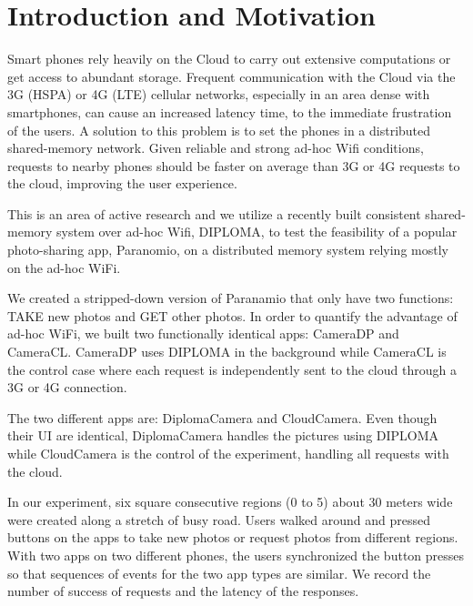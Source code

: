 \chapter{Introduction and Motivation}

Smart phones rely heavily on the Cloud to carry out extensive computations or get access to abundant storage.  Frequent communication with the Cloud via the 3G (HSPA) or 4G (LTE) cellular networks, especially in an area dense with smartphones, can cause an increased latency time, to the immediate frustration of the users. A solution to this problem is to set the phones in a distributed shared-memory network. Given reliable and strong ad-hoc Wifi conditions, requests to nearby phones should be faster on average than 3G or 4G requests to the cloud, improving the user experience. 

This is an area of active research and we utilize a recently built consistent shared-memory system over ad-hoc Wifi, DIPLOMA, to test the feasibility of a popular photo-sharing app, Paranomio, on a distributed memory system relying mostly on the ad-hoc WiFi.

We created a stripped-down version of Paranamio that only have two functions: TAKE new photos and GET other photos. In order to quantify the advantage of ad-hoc WiFi, we built two functionally identical apps: CameraDP and CameraCL. CameraDP uses DIPLOMA in the background while CameraCL is the control case where each request is independently sent to the cloud through a 3G or 4G connection.

The two different apps are: DiplomaCamera and CloudCamera. Even though their UI are identical, DiplomaCamera handles the pictures using DIPLOMA while CloudCamera is the control of the experiment, handling all requests with the cloud.


In our experiment, six square consecutive regions (0 to 5) about 30 meters wide were created along a stretch of busy road. Users walked around and pressed buttons on the apps to take new photos or request photos from different regions. With two apps on two different phones, the users synchronized the button presses so that sequences of events for the two app types are similar. We record the number of success of requests and the latency of the responses.